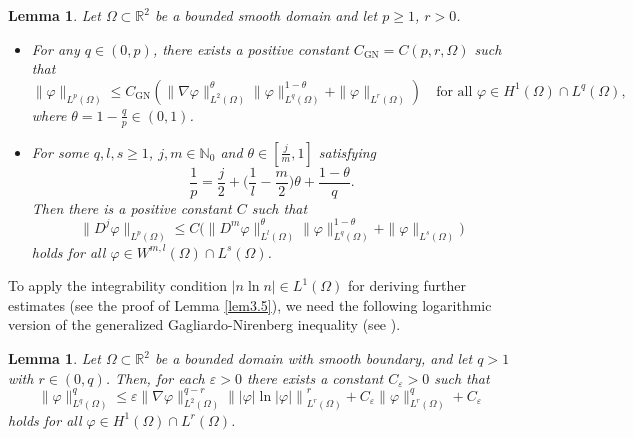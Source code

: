 \documentclass[10pt,a4paper]{amsart}
\numberwithin{equation}{section}
\newtheorem{lemma}[theo]{Lemma}
\begin{document}
\begin{lemma}\label{lem2.1}
Let $ \Omega \subset \mathbb{R}^2 $ be a bounded smooth domain and let $ p \geq 1 $, 
$ r > 0 $.
\begin{itemize}
\item[(i)] For any $ q \in (0, p) $, there exists a
positive constant $ C_{\mathrm{GN}} = C(p, r, \Omega) $ such that
\begin{equation}\label{9.12-1}
\|\varphi\|_{L^p(\Omega)} \leq C_{\mathrm{GN}} ( \|\nabla \varphi\|_{L^2(\Omega)}^\theta \|\varphi\|_{L^q(\Omega)}^{1 - \theta} + \|\varphi\|_{L^r(\Omega)} )
\quad \text{for all } \varphi \in H^1(\Omega) \cap L^q(\Omega),
\end{equation}
where
\(\theta = 1 - \frac{q}{p} \in (0, 1)\).

\item[(ii)] For some $q, l, s \geq 1$, $j, m \in \mathbb{N}_0$ and 
$\theta \in [ \frac{j}{m},1]$ satisfying
\[
\frac{1}{p}=\frac{j}{2}+\Big( \frac{1}{l}-\frac{m}{2} \Big)\theta 
+ \frac{1-\theta}{q}.
\] 
Then there is a positive constant $C$ such that
\begin{equation}\label{l2.7.10.1}
\| D^j \varphi \|_{L^p(\Omega)} 
\leq C \big( \| D^m \varphi \|_{L^l(\Omega)}^\theta \| \varphi 
\|_{L^q(\Omega)}^{1-\theta} + \| \varphi \|_{L^s(\Omega)} \big)
\end{equation}
holds for all $\varphi \in W^{m,l}(\Omega) \cap L^s(\Omega)$.
\end{itemize}
\end{lemma}

To apply the integrability condition $|n \ln n|\in L^1(\Omega)$ for deriving further 
estimates (see the proof of Lemma \ref{lem3.5}), we need the following
logarithmic version of the generalized Gagliardo-Nirenberg inequality 
(see \cite{Winkler2014}).

\begin{lemma}\label{lem2.3}
Let $ \Omega \subset \mathbb{R}^2 $ be a bounded domain with smooth boundary, 
and let $ q >1 $ with $ r \in (0, q) $. Then, for each $
\varepsilon > 0 $ there exists a constant $ C_\varepsilon > 0 $ such that
\begin{equation}\label{9.12-2}
\|\varphi\|_{L^q(\Omega)}^{q} 
\leq \varepsilon \|\nabla \varphi\|_{L^2(\Omega)}^{q - r} \left\| |\varphi| 
\ln |\varphi| \right\|_{L^r(\Omega)}^{r} +
C_\varepsilon \|\varphi\|_{L^r(\Omega)}^{q} + C_\varepsilon
\end{equation}
holds for all $\varphi \in H^{1}(\Omega) \cap L^r(\Omega)$.
\end{lemma}
\end{document}
